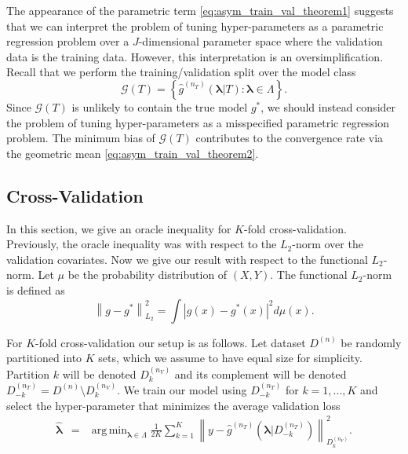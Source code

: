 \documentclass[12pt]{article} %
\theoremstyle{definition}
\DeclareMathOperator*{\argmin}{arg\,min}
\begin{document}
The appearance of the parametric term \eqref{eq:asym_train_val_theorem1} suggests that we can interpret the problem of tuning hyper-parameters as a parametric regression problem over a $J$-dimensional parameter space where the validation data is the training data. However, this interpretation is an oversimplification. Recall that we perform the training/validation split over the model class
\begin{equation}
\mathcal{G}(T) = \left \{ \hat{g}^{(n_T)}( {\boldsymbol{\lambda}}| T) : \boldsymbol{\lambda} \in \Lambda \right \}.
\end{equation}
Since $\mathcal{G}(T)$ is unlikely to contain the true model $g^*$, we should instead consider the problem of tuning hyper-parameters as a misspecified parametric regression problem. The minimum bias of $\mathcal{G}(T)$ contributes to the convergence rate via the geometric mean \eqref{eq:asym_train_val_theorem2}.

\subsection{Cross-Validation}\label{sec:cv}

In this section, we give an oracle inequality for $K$-fold cross-validation.
Previously, the oracle inequality was with respect to the $L_2$-norm over the validation covariates.
Now we give our result with respect to the functional $L_2$-norm.
Let $\mu$ be the probability distribution of $(X,Y)$.
The functional $L_2$-norm is defined as
\begin{equation}
\left \| g - g^* \right \|^2_{L_2} = \int \left |g(x) - g^*(x) \right |^2 d\mu(x).
\end{equation}

For $K$-fold cross-validation our setup is as follows. Let dataset $D^{(n)}$ be randomly partitioned into $K$ sets, which we assume to have equal size for simplicity. Partition $k$ will be denoted $D_k^{(n_V)}$ and its complement will be denoted $D_{-k}^{(n_T)} = D^{(n)} \setminus D_k^{(n_V)}$. We train our model using $D_{-k}^{(n_T)}$ for $k=1,...,K$ and select the hyper-parameter that minimizes the average validation loss
\begin{eqnarray}
\label{kfold_opt}
\hat{\boldsymbol \lambda} &=& \argmin_{\boldsymbol{\lambda} \in\Lambda} \frac{1}{2K} \sum_{k=1}^K  \left \| y-\hat{g}^{(n_T)}(\boldsymbol \lambda | D_{-k}^{(n_T)}) \right \|_{D_k^{(n_V)}}^{2}.
\end{eqnarray}
\end{document}
